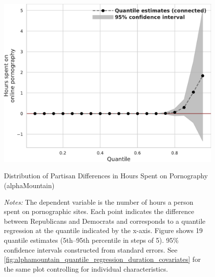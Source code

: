 \documentclass[12pt,twoside]{article}
\begin{document}
\begin{figure}[t]
	\centering
	\includegraphics[width=.6\linewidth]{figs/alphamountain_quantile_reg_duration_adult.pdf}
	\caption{Distribution of Partisan Differences in Hours Spent on Pornography (alphaMountain)}
	\caption*{\footnotesize \emph{Notes:} 
		The dependent variable is the number of hours a person spent on pornographic sites.
		Each point indicates the difference between Republicans and Democrats and corresponds to a quantile regression at the quantile indicated by the x-axis.
  Figure shows 19 quantile estimates (5th--95th percentile in steps of 5).
		95\% confidence intervals constructed from standard errors.
		See \cref{fig:alphamountain_quantile_regression_duration_covariates} for the same plot controlling for individual characteristics.
	}
	\label{fig:alphamountain_quantile_regression_duration}
\end{figure}
\end{document}
